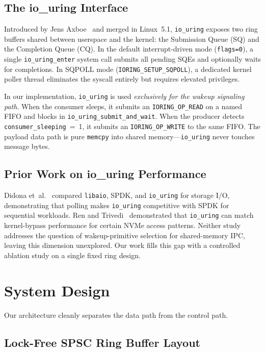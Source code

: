 \documentclass[10pt,conference]{IEEEtran}
\begin{document}
\subsection{The io\_uring Interface}

Introduced by Jens Axboe~\cite{axboe2019} and merged in Linux~5.1,
\texttt{io\_uring} exposes two ring buffers shared between userspace and the
kernel: the Submission Queue (SQ) and the Completion Queue (CQ).  In the
default interrupt-driven mode (\texttt{flags=0}), a single
\texttt{io\_uring\_enter} system call submits all pending SQEs and optionally
waits for completions.  In SQPOLL mode (\texttt{IORING\_SETUP\_SQPOLL}), a
dedicated kernel poller thread eliminates the syscall entirely but requires
elevated privileges.

In our implementation, \texttt{io\_uring} is used \emph{exclusively for the
wakeup signaling path}.  When the consumer sleeps, it submits an
\texttt{IORING\_OP\_READ} on a named FIFO and blocks in
\texttt{io\_uring\_submit\_and\_wait}.  When the producer detects
\texttt{consumer\_sleeping}~=~1, it submits an \texttt{IORING\_OP\_WRITE} to
the same FIFO.  The payload data path is pure \texttt{memcpy} into shared
memory---\texttt{io\_uring} never touches message bytes.

\subsection{Prior Work on io\_uring Performance}

Didona et~al.~\cite{didona2022} compared \texttt{libaio}, SPDK, and
\texttt{io\_uring} for storage I/O, demonstrating that polling makes \texttt{io\_uring}
competitive with SPDK for sequential workloads.  Ren and Trivedi~\cite{ren2023} demonstrated
that \texttt{io\_uring} can match kernel-bypass performance for certain NVMe
access patterns.  Neither study addresses the question of wakeup-primitive
selection for shared-memory IPC, leaving this dimension unexplored.  Our work
fills this gap with a controlled ablation study on a single fixed ring design.

\section{System Design}

Our architecture cleanly separates the data path from the control path.

\subsection{Lock-Free SPSC Ring Buffer Layout}
\end{document}
